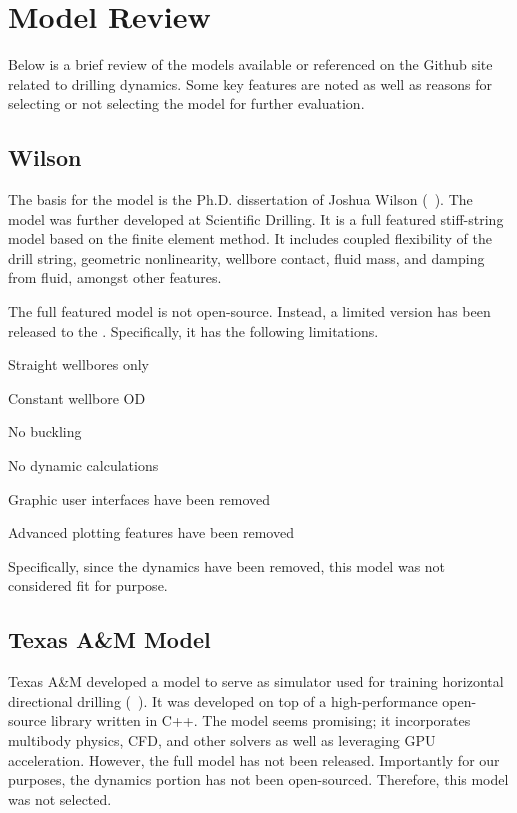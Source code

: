 \chapter{Model Review}
\label{ch:modelreview}

Below is a brief review of the models available or referenced on the \osdc{} Github site related to drilling dynamics.  Some key features are noted as well as reasons for selecting or not selecting the model for further evaluation.

\section{Wilson}
The basis for the model is the Ph.D. dissertation of Joshua Wilson (~\cite{ref:wilson2017a}).  The model was further developed at Scientific Drilling.  It is a full featured stiff-string model based on the finite element method.  It includes coupled flexibility of the drill string, geometric nonlinearity, wellbore contact, fluid mass, and damping from fluid, amongst other features.

The full featured model is not open-source.  Instead, a limited version has been released to the \osdc{}.  Specifically, it has the following limitations.
\begin{bulletedlist}
	\item Straight wellbores only
	\item Constant wellbore OD
	\item No buckling
	\item No dynamic calculations
	\item Graphic user interfaces have been removed
	\item Advanced plotting features have been removed
\end{bulletedlist}
Specifically, since the dynamics have been removed, this model was not considered fit for purpose.

\section{Texas A\&M Model}
Texas A\&M developed a model to serve as simulator used for training horizontal directional drilling (~\cite{ref:losoya2020a}).  It was developed on top of a high-performance open-source library written in C++.  The model seems promising; it incorporates multibody physics, CFD, and other solvers as well as leveraging GPU acceleration.  However, the full model has not been released.  Importantly for our purposes, the dynamics portion has not been open-sourced.  Therefore, this model was not selected.

